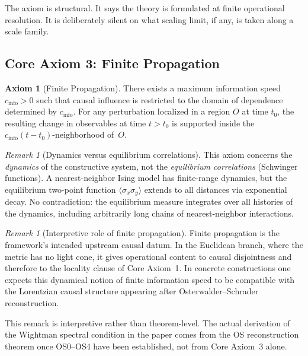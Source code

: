 \documentclass[12pt,a4paper]{article}
\theoremstyle{plain}
\theoremstyle{definition}
\newtheorem{axiom}[theorem]{Axiom}
\theoremstyle{remark}
\newtheorem{remark}[theorem]{Remark}
\begin{document}
The axiom is structural. It says the theory is formulated at finite
operational resolution. It is deliberately silent on what scaling
limit, if any, is taken along a scale family.


\subsection{Core Axiom 3: Finite Propagation}

\begin{axiom}[Finite Propagation]\label{ax:propagation}
  There exists a maximum information speed $c_{\mathrm{info}} > 0$
  such that causal influence is restricted to the domain of dependence
  determined by $c_{\mathrm{info}}$. For any perturbation localized in
  a region $O$ at time $t_0$, the resulting change in observables at
  time $t > t_0$ is supported inside the
  $c_{\mathrm{info}}(t-t_0)$-neighborhood of~$O$.
\end{axiom}

\begin{remark}[Dynamics versus equilibrium correlations]\label{rem:dynamics-vs-eq}
  This axiom concerns the \emph{dynamics} of the constructive system,
  not the \emph{equilibrium correlations} (Schwinger functions). A
  nearest-neighbor Ising model has finite-range dynamics, but the
  equilibrium two-point function $\langle \sigma_x \sigma_y\rangle$
  extends to all distances via exponential decay. No contradiction:
  the equilibrium measure integrates over all histories of the
  dynamics, including arbitrarily long chains of nearest-neighbor
  interactions.
\end{remark}

\begin{remark}[Interpretive role of finite propagation]
  \label{rem:propagation-chain}
  Finite propagation is the framework's intended upstream causal datum.
  In the Euclidean branch, where the metric has no light cone, it gives
  operational content to causal disjointness and therefore to the
  locality clause of Core Axiom~1. In concrete constructions one
  expects this dynamical notion of finite information speed to be
  compatible with the Lorentzian causal structure appearing after
  Osterwalder--Schrader reconstruction.

  This remark is interpretive rather than theorem-level. The actual
  derivation of the Wightman spectral condition in the paper comes from
  the OS reconstruction theorem once OS0--OS4 have been established,
  not from Core Axiom~3 alone.
\end{remark}
\end{document}

